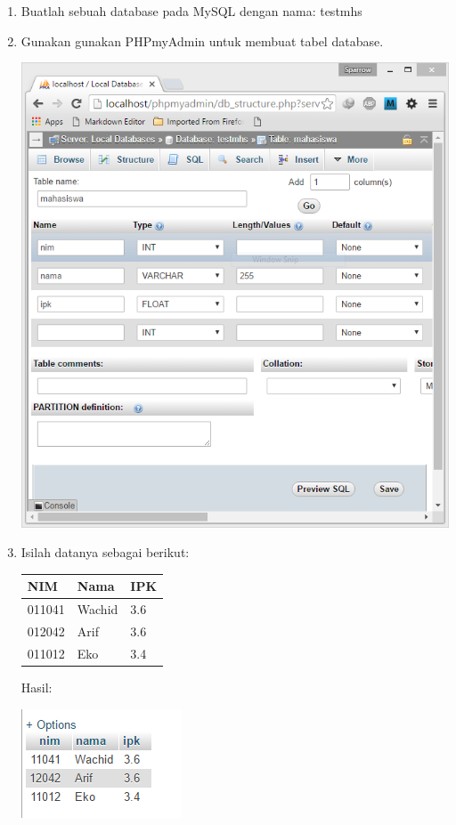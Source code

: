 \begin{enumerate}


\item
  Buatlah sebuah database pada MySQL dengan nama: testmhs
\item
  Gunakan gunakan PHPmyAdmin untuk membuat tabel database.
  
  \includegraphics[width=0.7\linewidth]{../manuscript/images/phpmyadmin}
  
\item
  Isilah datanya sebagai berikut:

\begin{longtable}[]{@{}lll@{}}
\toprule
NIM & Nama & IPK\tabularnewline
\midrule
\endhead
011041 & Wachid & 3.6\tabularnewline
012042 & Arif & 3.6\tabularnewline
011012 & Eko & 3.4\tabularnewline
\bottomrule
\end{longtable}

Hasil:

\includegraphics[width=0.7\linewidth]{../manuscript/images/database-mhs}


\end{enumerate}
